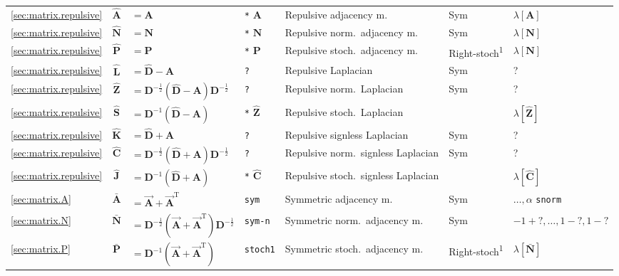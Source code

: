 \documentclass{article}
\begin{document}
\begin{table}
{{\begin{tabular}{ l c@{\;}l l l l l }
    \midrule \midrule

    \ref{sec:matrix.repulsive} & $\mathbf{\hat A}$ &$=\mathbf A$& \texttt{*} $\mathbf A$ & Repulsive adjacency m. &
    Sym 		& $\lambda[\mathbf A]$ \\
    \ref{sec:matrix.repulsive} & $\mathbf{\hat N}$&$= \mathbf N$ & \texttt{*} $\mathbf N$ & Repulsive norm.\ adjacency m. &
    Sym 		& $\lambda[\mathbf N]$  \\
    \ref{sec:matrix.repulsive} & $\mathbf{\hat P}$&$ = \mathbf P$ & \texttt{*} $\mathbf P$ & Repulsive stoch.\ adjacency m. &
    Right-stoch\textsuperscript{1} 	& $\lambda[\mathbf N]$ \\

    \midrule

    \ref{sec:matrix.repulsive} & $\mathbf{\hat L}$&$=\mathbf{\hat D}-\mathbf A$ &
    \texttt{?} & Repulsive Laplacian & Sym & ? \\
    \ref{sec:matrix.repulsive} & $\mathbf{\hat Z}$&$=\mathbf D^{-\frac 12}(\mathbf{\hat D}-\mathbf A)\mathbf D^{-\frac 12}$ &
    \texttt{?} & Repulsive norm.\ Laplacian & Sym & ? \\
    \ref{sec:matrix.repulsive} & $\mathbf{\hat S}$&$=\mathbf D^{-1}(\mathbf{\hat D}-\mathbf A)$ &
    \texttt{*} $\mathbf{\hat Z}$ & Repulsive stoch.\ Laplacian & & $\lambda[\mathbf{\hat Z}]$ \\
    
    \midrule
    \ref{sec:matrix.repulsive} & $\mathbf{\hat K}$&$=\mathbf{\hat D}+\mathbf A$ &
    \texttt{?} & Repulsive signless Laplacian & Sym & ? \\
    \ref{sec:matrix.repulsive} & $\mathbf{\hat C}$&$=\mathbf D^{-\frac 12}(\mathbf{\hat D}+\mathbf A)\mathbf D^{-\frac 12}$ &
    \texttt{?} & Repulsive norm.\ signless Laplacian & Sym & ? \\
    \ref{sec:matrix.repulsive} & $\mathbf{\hat J}$&$=\mathbf D^{-1}(\mathbf{\hat D}+\mathbf A)$ &
    \texttt{*} $\mathbf{\hat C}$ & Repulsive stoch.\ signless Laplacian & & $\lambda[\mathbf{\hat C}]$ \\

    \midrule \midrule

    \ref{sec:matrix.A} & $\mathbf{\bar A}$&$=\vec{\mathbf A}+\vec{\mathbf A}^{\mathrm T}$ & \texttt{sym} & Symmetric adjacency m. &
    Sym 		& $\ldots, \alpha$ \texttt{snorm} \\
    \ref{sec:matrix.N} & $\mathbf{\bar N}$&$=\mathbf D^{-\frac 12}(\vec{\mathbf A}+\vec{\mathbf A}^{\mathrm T})\mathbf D^{-\frac 12}$ & \texttt{sym-n} & Symmetric norm.\ adjacency m. &
    Sym 		& $-1+?, \ldots, 1-?, 1-?$  \\
    \ref{sec:matrix.P} & $\mathbf{\bar P}$&$=\mathbf D^{-1}(\vec{\mathbf A}+\vec{\mathbf A}^{\mathrm T})$ & \texttt{stoch1} & Symmetric stoch.\ adjacency m. &
    Right-stoch\textsuperscript{1} 	& $\lambda[\mathbf{\bar N}]$ \\


\end{tabular}}}
\end{table}
\end{document}
